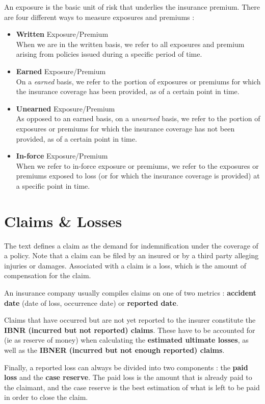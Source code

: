 \documentclass[11pt, english]{memoir}
\numberwithin{definition}{section}
\begin{document}
	An exposure is the basic unit of risk that underlies the insurance premium. There are four different ways to measure exposures and premiums : 
	\begin{itemize}
		\item \textbf{Written} Exposure/Premium \\
		When we are in the written basis, we refer to all exposures and premium arising from policies issued during a specific period of time.
		\item \textbf{Earned}  Exposure/Premium \\
		On a \emph{earned} basis, we refer to the portion of exposures or premiums for which the insurance coverage has been provided, as of a certain point in time. 
		\item \textbf{Unearned}  Exposure/Premium \\
		As opposed to an earned basis, on a \emph{unearned} basis, we refer to the portion of exposures or premiums for which the insurance coverage has not been provided, as of a certain point in time. 
		\item \textbf{In-force}  Exposure/Premium \\
		When we refer to in-force exposure or premiums, we refer to the exposures or premiums exposed to loss (or for which the insurance coverage is provided) at a specific point in time.   
	\end{itemize}
	
	\section{Claims \& Losses}
	The text defines a claim as the demand for indemnification under the coverage of a policy. Note that a claim can be filed by an insured or by a third party alleging injuries or damages. Associated with a claim is a loss,  which is the amount of compensation for the claim. 
	
	An insurance company usually compiles claims on one of two metrics : \textbf{accident date} (date of loss, occurrence date) or \textbf{reported date}. 
	
	Claims that have occurred but are not yet reported to the insurer constitute the \textbf{IBNR (incurred but not reported) claims}. These have to be accounted for (ie as reserve of money) when calculating the \textbf{estimated ultimate losses}, as well as the \textbf{IBNER (incurred but not enough reported) claims}. 
	
	Finally, a reported loss can always be divided into two components : the \textbf{paid loss} and the \textbf{case reserve}. The paid loss is the amount that is already paid to the claimant, and the case reserve is the best estimation of what is left to be paid in order to close the claim. 
	
\end{document}
